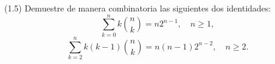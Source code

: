 
(1.5) Demuestre de manera combinatoria las siguientes dos identidades:
\[
  \sum_{k=0}^{n} k\binom{n}{k} = n2^{n-1}, \quad n \ge 1,
\]
\[
  \sum_{k=2}^{n} k(k-1)\binom{n}{k} = n(n-1)2^{n-2}, \quad n \ge 2.
\]
